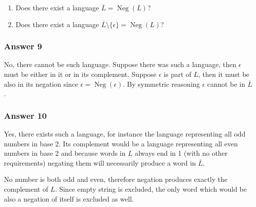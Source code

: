 \documentclass[11pt]{article}
\DeclareMathOperator{\Neg}{Neg}
\begin{document}
\begin{enumerate}
\item Does there exist a language \(\overline{L} = \Neg(L)\)?
\item Does there exist a language \(\overline{L} \setminus \{\epsilon\} = \Neg(L)\)?
\end{enumerate}

\subsubsection{Answer 9}
\label{sec:orgheadline13}
No, there cannot be such language.  Suppose there was such a language, then
\(\epsilon\) must be either in it or in its complement.  Suppose \(\epsilon\) is
part of \(L\), then it must be also in its negation since \(\epsilon =
    \Neg(\epsilon)\).  By symmetric reasoning \(\epsilon\) cannot be in \(\overline{L}\).

\subsubsection{Answer 10}
\label{sec:orgheadline14}
Yes, there exists such a language, for instance the language representing all
odd numbers in base 2.  Its complement would be a language representing all
even numbers in base 2 and because words in \(L\) always end in 1 (with no other
requirements) negating them will necessarily produce a word in \(\overline{L}\).

No number is both odd and even, therefore negation produces exactly the
complement of \(L\).  Since empty string is excluded, the only word which would
be also a negation of itself is excluded as well.
\end{document}
